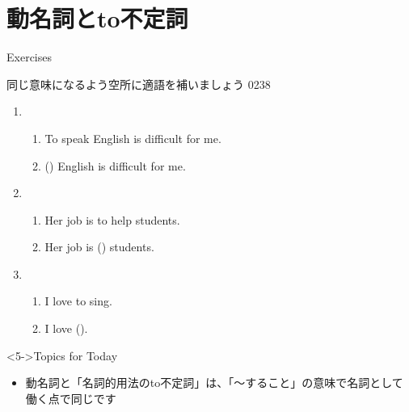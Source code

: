\documentclass[aspectratio=169,xcolor={dvipsnames,table}]{beamer}
\begin{document}
\section{動名詞とto不定詞}
\begin{frame}[plain]{Exercises}

{\small 同じ意味になるよう空所に適語を補いましょう}%
\hfill{\tiny 0238}\,{\scriptsize {}}
\begin{enumerate}
 \item \begin{enumerate}
	\item To speak English is difficult for me.
	\item () English is difficult for me.
       \end{enumerate}
 \item  \begin{enumerate}
	\item Her job is to help students.
	\item Her job is () students.
       \end{enumerate}
 \item \begin{enumerate}
	\item I love to sing.
	\item I love ().
       \end{enumerate}
\end{enumerate}

\begin{block}<5->{Topics for Today}
\begin{itemize}[square]\small
 \item  動名詞と「名詞的用法のto不定詞」は、「〜すること」の意味で名詞として働く点で同じです
\end{itemize}
     \end{block}
\end{frame}
\end{document}
